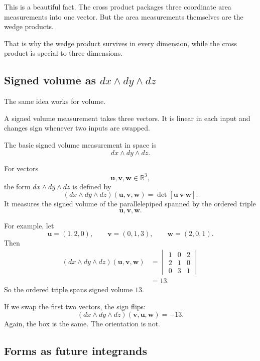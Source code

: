 This is a beautiful fact.  The cross product packages three coordinate area measurements
into one vector.  But the area measurements themselves are the wedge products.

That is why the wedge product survives in every dimension, while the cross product is
special to three dimensions.

\subsection{Signed volume as \(dx\wedge dy\wedge dz\)}

The same idea works for volume.

A signed volume measurement takes three vectors.  It is linear in each input and changes
sign whenever two inputs are swapped.

The basic signed volume measurement in space is
\[
    dx\wedge dy\wedge dz.
\]

\begin{definition}
For vectors
\[
    \mathbf u,\mathbf v,\mathbf w\in\mathbb R^3,
\]
the form \(dx\wedge dy\wedge dz\) is defined by
\[
\boxed{
    (dx\wedge dy\wedge dz)(\mathbf u,\mathbf v,\mathbf w)
    =
    \det[\mathbf u\ \mathbf v\ \mathbf w].
}
\]
It measures the signed volume of the parallelepiped spanned by the ordered triple
\[
    \mathbf u,\mathbf v,\mathbf w.
\]
\end{definition}

For example, let
\[
    \mathbf u=(1,2,0),
    \qquad
    \mathbf v=(0,1,3),
    \qquad
    \mathbf w=(2,0,1).
\]
Then
\[
\begin{aligned}
(dx\wedge dy\wedge dz)(\mathbf u,\mathbf v,\mathbf w)
&=
\begin{vmatrix}
1&0&2\\
2&1&0\\
0&3&1
\end{vmatrix}\\
&=
13.
\end{aligned}
\]
So the ordered triple spans signed volume \(13\).

If we swap the first two vectors, the sign flips:
\[
    (dx\wedge dy\wedge dz)(\mathbf v,\mathbf u,\mathbf w)
    =
    -13.
\]
Again, the box is the same.  The orientation is not.

\subsection{Forms as future integrands}

